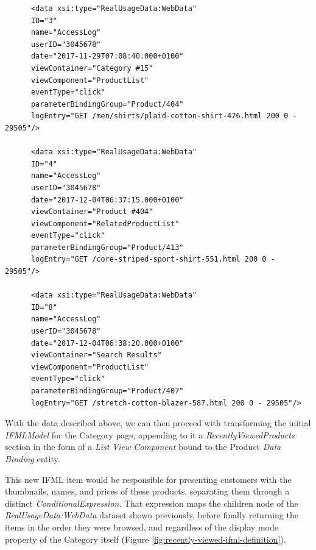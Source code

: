\vspace{0.5cm}
\lstset{language=XML}
\begin{lstlisting} 
      <data xsi:type="RealUsageData:WebData"
      ID="3"
      name="AccessLog"
      userID="3045678"
      date="2017-11-29T07:08:40.000+0100"
      viewContainer="Category #15"
      viewComponent="ProductList"
      eventType="click"
      parameterBindingGroup="Product/404"
      logEntry="GET /men/shirts/plaid-cotton-shirt-476.html 200 0 - 29505"/>
      
      <data xsi:type="RealUsageData:WebData"
      ID="4"
      name="AccessLog"
      userID="3045678"
      date="2017-12-04T06:37:15.000+0100"
      viewContainer="Product #404"
      viewComponent="RelatedProductList"
      eventType="click"
      parameterBindingGroup="Product/413"
      logEntry="GET /core-striped-sport-shirt-551.html 200 0 - 29505"/>

      <data xsi:type="RealUsageData:WebData"
      ID="8"
      name="AccessLog"
      userID="3045678"
      date="2017-12-04T06:38:20.000+0100"
      viewContainer="Search Results"
      viewComponent="ProductList"
      eventType="click"
      parameterBindingGroup="Product/407"
      logEntry="GET /stretch-cotton-blazer-587.html 200 0 - 29505"/>
\end{lstlisting}
\vspace{0.5cm}

With the data described above, we can then proceed with transforming the initial \textit{IFMLModel} for the Category page, appending to it a \textit{RecentlyViewedProducts} section in the form of a \textit{List View Component} bound to the Product \textit{Data Binding} entity.

This new IFML item would be responsible for presenting customers with the thumbnails, names, and prices of these products, separating them through a distinct \textit{ConditionalExpression}. That expression maps the children node of the \textit{RealUsageData:WebData} dataset shown previously, before finally returning the items in the order they were browsed, and regardless of the display mode property of the Category itself (Figure \ref{fig:recently-viewed-ifml-definition}).

